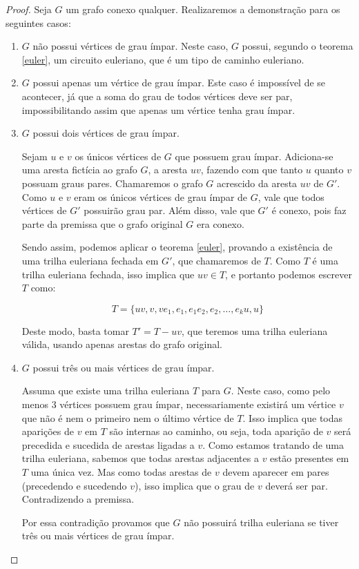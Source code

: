 \documentclass{article}
\begin{document}
\begin{proof}
    Seja $G$ um grafo conexo qualquer. Realizaremos a demonstração para os seguintes casos:
    \begin{enumerate}
        \item $G$ não possui vértices de grau ímpar. Neste caso, $G$ possui, segundo o teorema \ref{euler}, um circuito euleriano, que é um tipo de caminho euleriano.
        
        \item $G$ possui apenas um vértice de grau ímpar. 
			Este caso é impossível de se acontecer, já que a soma do grau de todos vértices deve ser par, impossibilitando assim que apenas um vértice tenha grau ímpar.
        
        \item $G$ possui dois vértices de grau ímpar. 

			Sejam $u$ e $v$ os únicos vértices de $G$ que possuem grau ímpar.
			Adiciona-se uma aresta fictícia ao grafo $G$, a aresta $uv$, fazendo com que tanto $u$ quanto $v$ possuam graus pares. 
			Chamaremos o grafo $G$ acrescido da aresta $uv$ de $G'$.
			Como $u$ e $v$ eram os únicos vértices de grau ímpar de $G$, vale que todos vértices de $G'$ possuirão grau par. 
			Além disso, vale que $G'$ é conexo, pois faz parte da premissa que o grafo original $G$ era conexo.

			Sendo assim, podemos aplicar o teorema \ref{euler}, provando a existência de uma trilha euleriana fechada em $G'$, que chamaremos de $T$.
			Como $T$ é uma trilha euleriana fechada, isso implica que $uv \in T$, e portanto podemos escrever $T$ como:
		
			\[
				T = \{uv, v, ve_1, e_1, e_1e_2, e_2, \dots, e_ku, u\}
			\]

			Deste modo, basta tomar $T' = T - uv$, que teremos uma trilha euleriana válida, usando apenas arestas do grafo original.


        \item $G$ possui três ou mais vértices de grau ímpar. 

			Assuma que existe uma trilha euleriana $T$ para $G$. 
			Neste caso, como pelo menos 3 vértices possuem grau ímpar, necessariamente existirá um vértice $v$ que não é nem o primeiro nem o último vértice de $T$.
			Isso implica que todas aparições de $v$ em $T$ são internas ao caminho, ou seja, toda aparição de $v$ será precedida e sucedida de arestas ligadas a $v$.
			Como estamos tratando de uma trilha euleriana, sabemos que todas arestas adjacentes a $v$ estão presentes em $T$ uma única vez. 
			Mas como todas arestas de $v$ devem aparecer em pares (precedendo e sucedendo $v$), isso implica que o grau de $v$ deverá ser par.
			Contradizendo a premissa.

			Por essa contradição provamos que  $G$ não possuirá trilha euleriana se tiver três ou mais vértices de grau ímpar.
    \end{enumerate}
\end{proof}
\end{document}
